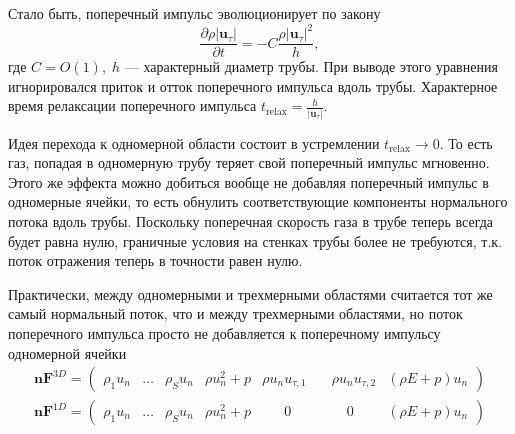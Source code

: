 \documentclass[12pt]{article}
\newcommand{\pd}[2]{\frac{\partial #1}{\partial #2}}
\newcommand{\bvec}[1]{\boldsymbol{\mathbf{#1}}}
\begin{document}
Стало быть, поперечный импульс эволюционирует по закону
\[
\pd{\rho |\bvec{u}_{\tau}|}{t} = -C\frac{\rho |\bvec{u}_\tau|^2}{h},
\]
где $C = O(1),\; h$ --- характерный диаметр трубы.
При выводе этого уравнения игнорировался приток и отток поперечного импульса вдоль трубы. Характерное время 
релаксации поперечного импульса $t_\text{relax} = \frac{h}{|\bvec{u}_\tau|}$.

Идея перехода к одномерной области состоит в устремлении $t_\text{relax} \rightarrow 0$. То есть газ, попадая 
в одномерную трубу теряет свой поперечный импульс мгновенно. Этого же эффекта можно добиться вообще не добавляя 
поперечный импульс в одномерные ячейки, то есть обнулить соответствующие компоненты нормального потока вдоль трубы.
Поскольку поперечная скорость газа в трубе теперь всегда будет равна нулю, граничные условия на стенках трубы 
более не требуются, т.к. поток отражения теперь в точности равен нулю.

Практически, между одномерными и трехмерными областями считается тот же самый нормальный поток, что и между
трехмерными областями, но поток поперечного импульса просто не добавляется к поперечному импульсу одномерной ячейки
\begin{gather*}
\bvec{n}\bvec{F}^{3D} = 
\begin{pmatrix}
\rho_1 u_n & \dots & \rho_S u_n &
 \rho u_n^2 + p & 
 \rho u_n u_{\tau,1}\phantom{0} & 
 \phantom{0}\rho u_n u_{\tau,2} & 
(\rho E + p) u_n
\end{pmatrix}\\
\bvec{n}\bvec{F}^{1D} = 
\begin{pmatrix}
\rho_1 u_n & \dots & \rho_S u_n &
 \rho u_n^2 + p & 
 \phantom{\rho u_n}0\phantom{u_{\tau,2}} & 
 \phantom{\rho u_n}0\phantom{u_{\tau,2}} & 
 (\rho E + p) u_n
\end{pmatrix}
\end{gather*}
\end{document}
